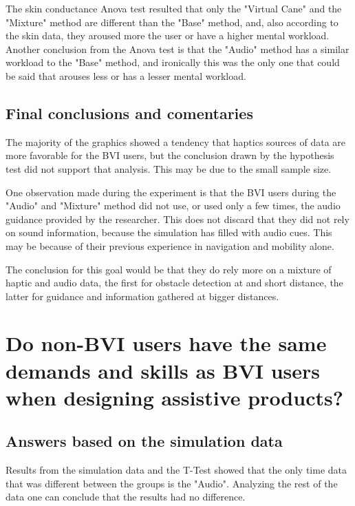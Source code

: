 The skin conductance Anova test resulted that only the "Virtual Cane" and the "Mixture" method are different than the "Base" method, and, also according to the skin data, they aroused more the user or have a higher mental workload. Another conclusion from the Anova test is that the "Audio" method has a similar workload to the "Base" method, and ironically this was the only one that could be said that arouses less or has a lesser mental workload.

\subsection{Final conclusions and comentaries}

The majority of the graphics showed a tendency that haptics sources of data are more favorable for the BVI users, but the conclusion drawn by the hypothesis test did not support that analysis. This may be due to the small sample size.

One observation made during the experiment is that the BVI users during the "Audio" and "Mixture" method did not use, or used only a few times, the audio guidance provided by the researcher. This does not discard that they did not rely on sound information, because the simulation has filled with audio cues. This may be because of their previous experience in navigation and mobility alone.

The conclusion for this goal would be that they do rely more on a mixture of haptic and audio data, the first for obstacle detection at and short distance, the latter for guidance and information gathered at bigger distances.


\section{Do non-BVI users have the same demands and skills as BVI users when designing assistive products?}

\subsection{Answers based on the simulation data}

Results from the simulation data and the T-Test showed that the only time data that was different between the groups is the "Audio". Analyzing the rest of the data one can conclude that the results had no difference.

